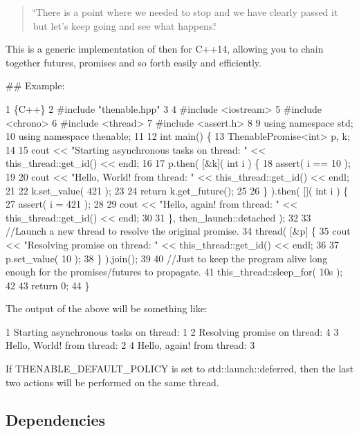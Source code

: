 \begin{quote}
\char`\"{}\+There is a point where we needed to stop and we have clearly passed it but let’s keep going and see what happens.\char`\"{} \end{quote}


This is a generic implementation of {\ttfamily then} for C++14, allowing you to chain together futures, promises and so forth easily and efficiently.

\#\# Example\+: 
\begin{DoxyCode}
1 \{C++\}
2 #include "thenable.hpp"
3 
4 #include <iostream>
5 #include <chrono>
6 #include <thread>
7 #include <assert.h>
8 
9 using namespace std;
10 using namespace thenable;
11 
12 int main() \{
13     ThenablePromise<int> p, k;
14 
15     cout << "Starting asynchronous tasks on thread: " << this\_thread::get\_id() << endl;
16 
17     p.then( [&k]( int i ) \{
18         assert( i == 10 );
19 
20         cout << "Hello, World! from thread: " << this\_thread::get\_id() << endl;
21 
22         k.set\_value( 421 );
23 
24         return k.get\_future();
25 
26     \} ).then( []( int i ) \{
27         assert( i = 421 );
28 
29         cout << "Hello, again! from thread: " << this\_thread::get\_id() << endl;
30 
31     \}, then\_launch::detached );
32 
33     //Launch a new thread to resolve the original promise.
34     thread( [&p] \{
35         cout << "Resolving promise on thread: " << this\_thread::get\_id() << endl;
36 
37         p.set\_value( 10 );
38     \} ).join();
39 
40     //Just to keep the program alive long enough for the promises/futures to propagate.
41     this\_thread::sleep\_for( 10s );
42 
43     return 0;
44 \}
\end{DoxyCode}


The output of the above will be something like\+: 
\begin{DoxyCode}
1 Starting asynchronous tasks on thread: 1
2 Resolving promise on thread: 4
3 Hello, World! from thread: 2
4 Hello, again! from thread: 3
\end{DoxyCode}


If {\ttfamily T\+H\+E\+N\+A\+B\+L\+E\+\_\+\+D\+E\+F\+A\+U\+L\+T\+\_\+\+P\+O\+L\+I\+CY} is set to {\ttfamily std\+::launch\+::deferred}, then the last two actions will be performed on the same thread.

\subsection*{Dependencies}

